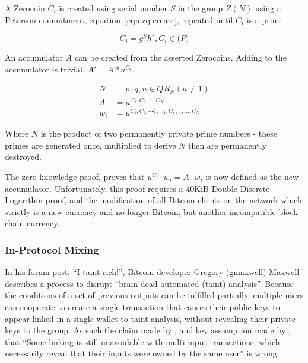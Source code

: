 A Zerocoin $C_{i}$ is created using serial number $S$ in the group $Z(N)$ using a Peterson commitment, equation~\ref{eqn:zq-create}, repeated until $C_i$ is a prime.

\begin{equation}\label{eqn:zq-create}
C_{i}=g^Sh^r, C_i \in \mathbb(P)
\end{equation}

An accumulator $A$ can be created from the asserted Zerocoins.  Adding to the accumulator is trivial, $A' = A*u^{C_i}$.

\begin{subequations}
    \begin{align}\label{eqn:zkp}
        N &= p \cdot q, u \in QR_{N}(u\neq1)\\
        A &= u^{C_1, C_2,\dots,C_N}\\
        w_i &=  u^{C_1, C_2,\cdots C_{i-1}, C_{i+1}, \dots ,C_N}
    \end{align}
\end{subequations}

Where $N$ is the product of two permanently private prime numbers - these primes are generated once, multiplied to derive $N$ then are permanently destroyed.

The zero knowledge proof, proves that $u^{C_i} \cdot w_i = A$. $w_i$ is now defined as the new accumulator. Unfortunately, this proof requires a 40KiB Double Discrete Logarithm proof, and the modification of all Bitcoin clients on the network which strictly is a new currency and no longer Bitcoin, but another incompatible block chain currency.

\subsubsection{In-Protocol Mixing}
In his forum post, ``I taint rich!'', Bitcoin developer Gregory (gmaxwell) Maxwell describes a process to disrupt ``brain-dead automated (taint) analysis''\cite{taint-rich}.  Because the conditions of a set of previous outputs can be fulfilled partially, multiple users can cooperate to create a single transaction that causes their public keys to appear linked in a single wallet to taint analysis, without revealing their private keys to the group.  As such the claim made by \textcite{satoshi}, and key assumption made by \textcite{reid-anon}, that ``Some linking is still unavoidable with multi-input transactions, which necessarily reveal that their inputs were owned by the same user'' is wrong.

